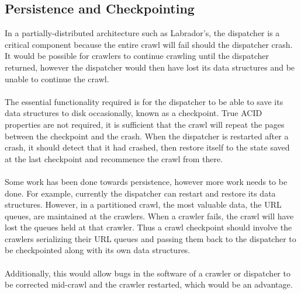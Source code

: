 \subsection{Persistence and Checkpointing}
In a partially-distributed architecture such as Labrador's, the dispatcher is a critical component because the entire crawl will fail should the dispatcher crash. It would be possible for crawlers to continue crawling until the dispatcher returned, however the dispatcher would then have lost its data structures and be unable to continue the crawl.\\
\ \\
The essential functionality required is for the dispatcher to be able to save its data structures to disk occasionally, known as a checkpoint. True ACID properties are not required, it is sufficient that the crawl will repeat the pages between the checkpoint and the crash\cite{ref1}. When the dispatcher is restarted after a crash, it should detect that it had crashed, then restore itself to the state saved at the last checkpoint and recommence the crawl from there.\\
\ \\
Some work has been done towards persistence, however more work needs to be done. For example, currently the dispatcher can restart and restore its data structures. However, in a partitioned crawl, the most valuable data, the URL queues, are maintained at the crawlers. When a crawler fails, the crawl will have lost the queues held at that crawler. Thus a crawl checkpoint should involve the crawlers serializing their URL queues and passing them back to the dispatcher to be checkpointed along with its own data structures.\\
\ \\
Additionally, this would allow bugs in the software of a crawler or dispatcher to be corrected mid-crawl and the crawler restarted, which would be an advantage\cite{ref1}.

